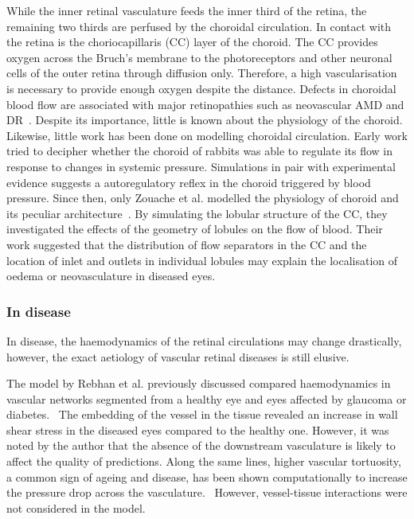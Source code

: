 \documentclass[12pt,a4paper]{journal}
\begin{document}
While the inner retinal vasculature feeds the inner third of the retina, the remaining two thirds are perfused by the choroidal circulation.
In contact with the retina is the choriocapillaris (CC) layer of the choroid.
The CC provides oxygen across the Bruch's membrane to the photoreceptors and other neuronal cells of the outer retina through diffusion only.
Therefore, a high vascularisation is necessary to provide enough oxygen despite the distance.
Defects in choroidal blood flow are associated with major retinopathies such as neovascular AMD and DR~\cite{Pemp_2008}.
Despite its importance, little is known about the physiology of the choroid.
Likewise, little work has been done on modelling choroidal circulation.
Early work tried to decipher whether the choroid of rabbits was able to regulate its flow in response to changes in systemic pressure.\cite{Kiel_1992}
Simulations in pair with experimental evidence suggests a autoregulatory reflex in the choroid triggered by blood pressure.
Since then, only Zouache et al. modelled the physiology of choroid and its peculiar architecture~\cite{Zouache_2015}.
By simulating the lobular structure of the CC, they investigated the effects of the geometry of lobules on the flow of blood.
Their work suggested that the distribution of flow separators in the CC and the location of inlet and outlets in individual lobules may explain the localisation of oedema or neovasculature in diseased eyes.\cite{Zouache_2015}



\subsubsection*{In disease}

In disease, the haemodynamics of the retinal circulations may change drastically, however, the exact aetiology of vascular retinal diseases is still elusive.

The model by Rebhan et al. previously discussed compared haemodynamics in vascular networks segmented from a healthy eye and eyes affected by glaucoma or diabetes.~\cite{Rebhan_2019}
The embedding of the vessel in the tissue revealed an increase in wall shear stress in the diseased eyes compared to the healthy one.
However, it was noted by the author that the absence of the downstream vasculature is likely to affect the quality of predictions.\cite{Rebhan_2019}
Along the same lines, higher vascular tortuosity, a common sign of ageing and disease, has been shown computationally to increase the pressure drop across the vasculature.~\cite{Malek_2014}
However, vessel-tissue interactions were not considered in the model.
\end{document}
